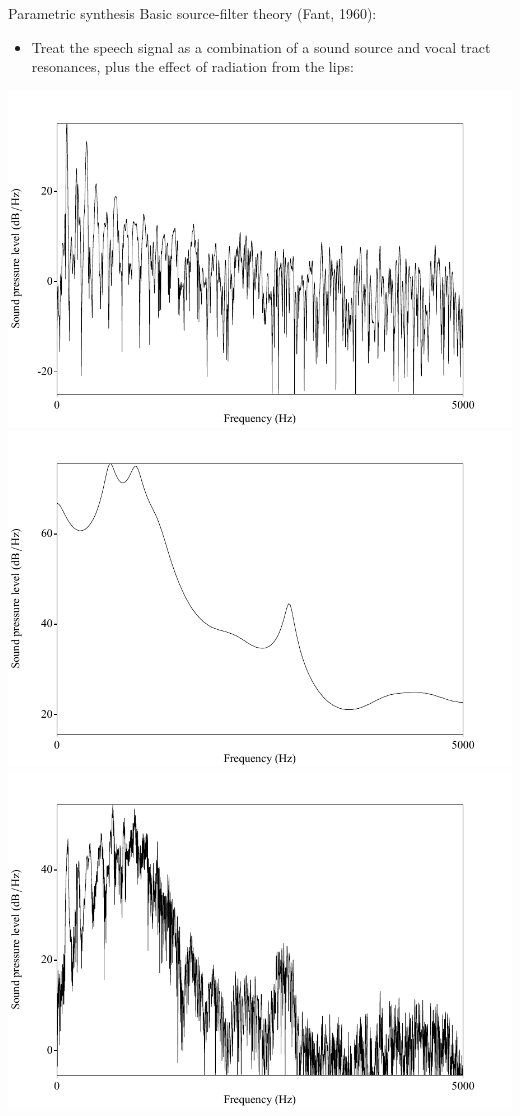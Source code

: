 \documentclass{beamer}
\begin{document}
\begin{frame}{Parametric synthesis}
Basic source-filter theory (Fant, 1960):
\begin{itemize}
\item{Treat the speech signal as a combination of a sound source and vocal tract resonances, plus the effect of radiation from the lips:}
\end{itemize}
\includegraphics[scale=0.225,keepaspectratio]{aa_source.pdf}
\includegraphics[scale=0.225,keepaspectratio]{aa_filter.pdf}
\includegraphics[scale=0.225,keepaspectratio]{aa_conv.pdf}

\end{frame}
\end{document}
